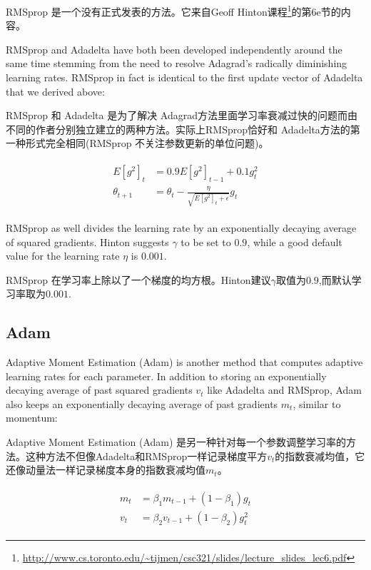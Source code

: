 \documentclass{article}
\begin{document}
RMSprop 是一个没有正式发表的方法。它来自Geoff Hinton课程\footnote{\url{http://www.cs.toronto.edu/~tijmen/csc321/slides/lecture_slides_lec6.pdf}}的第6e节的内容。

RMSprop and Adadelta have both been developed independently around the same time stemming from the need to resolve Adagrad's radically diminishing learning rates. RMSprop in fact is identical to the first update vector of Adadelta that we derived above:

RMSprop 和 Adadelta 是为了解决 Adagrad方法里面学习率衰减过快的问题而由不同的作者分别独立建立的两种方法。实际上RMSprop恰好和 Adadelta方法的第一种形式完全相同(RMSprop 不关注参数更新的单位问题)。

\begin{align}
\begin{split}
E[g^2]_t &= 0.9 E[g^2]_{t-1} + 0.1 g^2_t\\
\theta_{t+1} &= \theta_{t} - \frac{\eta}{\sqrt{E[g^2]_t + \epsilon}} g_{t}
\end{split}
\end{align}

RMSprop as well divides the learning rate by an exponentially decaying average of squared gradients. Hinton suggests $\gamma$ to be set to $0.9$, while a good default value for the learning rate $\eta$ is $0.001$.

RMSprop 在学习率上除以了一个梯度的均方根。Hinton建议$\gamma$取值为$0.9$,而默认学习率取为$0.001$.

\subsection{Adam}

Adaptive Moment Estimation (Adam) \cite{Kingma2015} is another method that computes adaptive learning rates for each parameter. In addition to storing an exponentially decaying average of past squared gradients $v_t$ like Adadelta and RMSprop, Adam also keeps an exponentially decaying average of past gradients $m_t$, similar to momentum:

Adaptive Moment Estimation (Adam) \cite{Kingma2015} 是另一种针对每一个参数调整学习率的方法。这种方法不但像Adadelta和RMSprop一样记录梯度平方$v_t$的指数衰减均值，它还像动量法一样记录梯度本身的指数衰减均值$m_t$。

\begin{align}
\begin{split}
m_t &= \beta_1 m_{t-1} + (1 - \beta_1) g_t\\
v_t &= \beta_2 v_{t-1} + (1 - \beta_2) g_t^2
\end{split}
\end{align}
\end{document}
